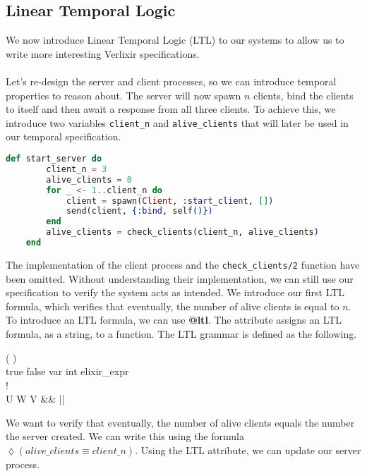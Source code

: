 \subsection{Linear Temporal Logic}
We now introduce Linear Temporal Logic (LTL) to our systems to allow us to write more interesting Verlixir specifications.
\\ \\
Let's re-design the server and client processes, so we can introduce temporal properties to reason about. The server will now spawn $n$ clients, bind the clients to itself and then await a response from all three clients. To achieve this, we introduce two variables \texttt{client\_n} and \texttt{alive\_clients} that will later be used in our temporal specification.
\begin{lstlisting}[language=Elixir, xleftmargin=.2\linewidth]
    def start_server do
        client_n = 3
        alive_clients = 0
        for _ <- 1..client_n do
            client = spawn(Client, :start_client, [])
            send(client, {:bind, self()})
        end
        alive_clients = check_clients(client_n, alive_clients)
    end
\end{lstlisting}
The implementation of the client process and the \texttt{check\_clients/2} function have been omitted. Without understanding their implementation, we can still use our specification to verify the system acts as intended. We introduce our first LTL formula, which verifies that eventually, the number of alive clients is equal to $n$. To introduce an LTL formula, we can use \textbf{@ltl}. The attribute assigns an LTL formula, as a string, to a function. The LTL grammar is defined as the following.
\begin{bnf*}
      { \bnfor (  ) \bnfor {}   \bnfor {} }\\
      {true \bnfor false \bnfor var \bnfor int \bnfor elixir\_expr}\\
      {\square \bnfor \lozenge \bnfor !}\\
      {U \bnfor W \bnfor V \bnfor \&\& \bnfor || \bnfor \rightarrow \bnfor \leftrightarrow }\\
\end{bnf*}
We want to verify that eventually, the number of alive clients equals the number the server created. We can write this using the formula $\lozenge (alive\_clients \equiv client\_n)$. Using the LTL attribute, we can update our server process.
